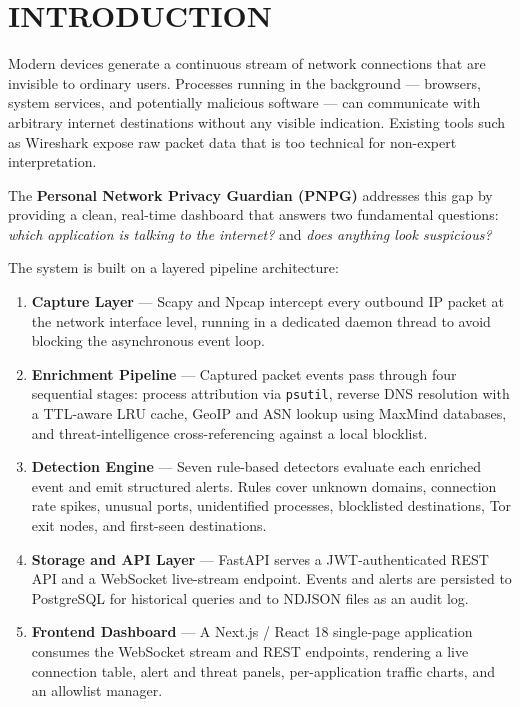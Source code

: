 \documentclass[12pt]{article}
\begin{document}
\section*{INTRODUCTION}
Modern devices generate a continuous stream of network connections that are
invisible to ordinary users. Processes running in the background --- browsers,
system services, and potentially malicious software --- can communicate with
arbitrary internet destinations without any visible indication. Existing tools
such as Wireshark expose raw packet data that is too technical for non-expert
interpretation.

The \textbf{Personal Network Privacy Guardian (PNPG)} addresses this gap by
providing a clean, real-time dashboard that answers two fundamental questions:
\textit{which application is talking to the internet?} and \textit{does anything
look suspicious?}

The system is built on a layered pipeline architecture:

\begin{enumerate}
    \item \textbf{Capture Layer} --- Scapy and Npcap intercept every outbound
          IP packet at the network interface level, running in a dedicated daemon
          thread to avoid blocking the asynchronous event loop.

    \item \textbf{Enrichment Pipeline} --- Captured packet events pass through
          four sequential stages: process attribution via \texttt{psutil},
          reverse DNS resolution with a TTL-aware LRU cache, GeoIP and ASN
          lookup using MaxMind databases, and threat-intelligence cross-referencing
          against a local blocklist.

    \item \textbf{Detection Engine} --- Seven rule-based detectors evaluate
          each enriched event and emit structured alerts. Rules cover unknown
          domains, connection rate spikes, unusual ports, unidentified processes,
          blocklisted destinations, Tor exit nodes, and first-seen destinations.

    \item \textbf{Storage and API Layer} --- FastAPI serves a JWT-authenticated
          REST API and a WebSocket live-stream endpoint. Events and alerts are
          persisted to PostgreSQL for historical queries and to NDJSON files as
          an audit log.

    \item \textbf{Frontend Dashboard} --- A Next.js / React 18 single-page
          application consumes the WebSocket stream and REST endpoints, rendering
          a live connection table, alert and threat panels, per-application
          traffic charts, and an allowlist manager.
\end{enumerate}
\end{document}
